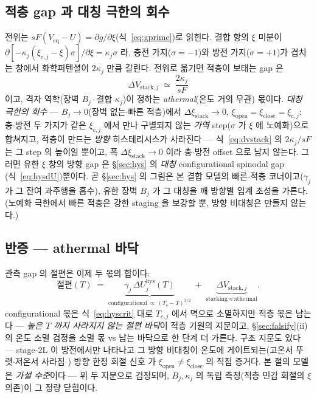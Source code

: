 \documentclass[11pt,a4paper]{article}
\newcommand{\eq}{\mathrm{eq}}
\newcommand{\hys}{\mathrm{hys}}
\begin{document}
\subsection{적층 gap 과 대칭 극한의 회수}
전위는 $sF(V_{\eq}-U)=\partial g/\partial\xi$(식~\eqref{eq:gprime})로 읽힌다. 결합 항의 $\xi$ 미분이
$\partial[-\kappa_j(\xi_{c,j}-\xi)\sigma]/\partial\xi=\kappa_j\sigma$ 라, 충전 가지($\sigma=-1$)와 방전
가지($\sigma=+1$)가 겹치는 창에서 화학퍼텐셜이 $2\kappa_j$ 만큼 갈린다. 전위로 옮기면 적층이 보태는 gap 은
\begin{equation}
\Delta V_{\mathrm{stack},j}\;\simeq\;\frac{2\kappa_j}{sF}
\label{eq:dvstack}
\end{equation}
이고, 격자 역학(장벽 $B_j\cdot$결합 $\kappa_j$)이 정하는 \emph{athermal}(온도 거의 무관) 몫이다.
\emph{대칭 극한의 회수} — $B_j\to0$(장벽 없는$\cdot$빠른 적층)에서 $\Delta\xi_{\mathrm{stack}}\to0$,
$\xi_{\mathrm{open}}=\xi_{\mathrm{close}}=\xi_{c,j}$: 충$\cdot$방전 두 가지가 같은 $\xi_{c,j}$ 에서
만나 구별되지 않는 \emph{가역} step($\sigma$ 가 $\xi$ 에 노예화)으로 합쳐지고, 적층이 만드는
\emph{방향} 히스테리시스가 사라진다 — 식~\eqref{eq:dvstack} 의 $2\kappa_j/sF$ 는 그 step 의 높이일
뿐이고, 폭 $\Delta\xi_{\mathrm{stack}}\to0$ 이라 충$\cdot$방전 offset 으로 남지 않는다. 그러면 유한
$\xi$ 창의 방향 gap 은 \S\ref{sec:hys} 의 \emph{대칭} configurational spinodal gap
(식~\eqref{eq:hysdU})뿐이다. 곧 \S\ref{sec:hys} 의 그림은 본 결합 모델의 빠른-적층
코너이고($\gamma_j$ 가 그 잔여 과주행을 흡수), 유한 장벽 $B_j$ 가 그 대칭을 깨 방향별 임계 조성을
가른다. (노예화 극한에서 빠른 적층은 강한 staging 을 보강할 뿐, 방향 비대칭은 만들지 않는다.)

\subsection{반증 — athermal 바닥}
관측 gap 의 절편은 이제 두 몫의 합이다:
\begin{equation}
\text{절편}(T)\;=\;
\underbrace{\gamma_j\,\Delta U_j^\hys(T)}_{\text{configurational}\,\propto\,(T_c-T)^{3/2}}
\;+\;\underbrace{\Delta V_{\mathrm{stack},j}}_{\text{stacking}\,\approx\,\text{athermal}}.
\label{eq:gapsplit}
\end{equation}
configurational 몫은 식~\eqref{eq:hyscrit} 대로 $T_{c,j}$ 에서 멱으로 소멸하지만 적층 몫은 남는다 —
\emph{높은 $T$ 까지 사라지지 않는 절편 바닥}이 적층 기원의 지문이고, \S\ref{sec:falsify}(ii) 의 온도
소멸 검정을 소멸 몫 vs 남는 바닥으로 한 단계 더 가른다. 구조 지문도 있다 — stage-2L 이 방전에서만
나타나고 그 방향 비대칭이 온도에 게이트되는(고온서 뚜렷$\cdot$저온서 사라짐 \cite{schmitt2022}) 방향
한정 회절 신호 \cite{didier2020} 가 $\xi_{\mathrm{open}}\ne\xi_{\mathrm{close}}$
의 직접 증거다. 본 절의 모델은 \emph{가설 수준}이다 — 위 두 지문으로 검정되며, $B_j,\kappa_j$ 의 독립
측정(적층 민감 회절의 $\xi$ 의존)이 그 정량 닫힘이다.
\end{document}
